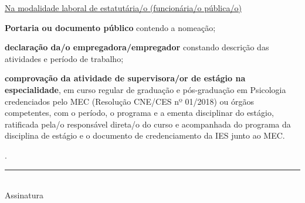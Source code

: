 \documentclass[openright, oneside, a4paper, article, brazil]{abntex2}
\newcommand{\caixasel}[1]{\raisebox{-6pt}{\fbox{\CheckBox[name=#1,bordercolor=black]{\null}}}}
\begin{document}
    \begin{minipage}{\textwidth}
        \centering
\underline{Na modalidade laboral de estatutária/o (funcionária/o pública/o)}
\end{minipage}
\vspace{0.25\baselineskip}

\normalfont
\begin{minipage}[t]{0.05\textwidth}
    \caixasel{est1}
\end{minipage}%
\begin{minipage}[t]{0.95\textwidth}
	\textbf{Portaria ou documento público} contendo a nomeação;
\end{minipage}
   \vspace*{0.25\baselineskip}

\begin{minipage}[t]{0.05\textwidth}
    \caixasel{est2}
\end{minipage}%
\begin{minipage}[t]{0.95\textwidth}
	\textbf{declaração da/o empregadora/empregador} constando descrição das atividades e período de trabalho;
\end{minipage}
    \vspace*{0.25\baselineskip}

\begin{minipage}[t]{0.05\textwidth}
    \caixasel{est3}
\end{minipage}%
\begin{minipage}[t]{0.95\textwidth}
	\textbf{comprovação da atividade de supervisora/or de estágio na especialidade}, em curso regular de graduação e pós-graduação em Psicologia credenciados pelo MEC (Resolução CNE/CES nº 01/2018) ou órgãos competentes, com o período, o programa e a ementa disciplinar do estágio, ratificada pela/o responsável direta/o do curso e acompanhada do programa da disciplina de estágio e o documento de credenciamento da IES junto ao MEC.
\end{minipage}

\vspace{2\baselineskip}

\raggedright{}   .
\vspace*{3\baselineskip}

\centering
\rule{24em}{0.4pt}\\
Assinatura
\end{document}
